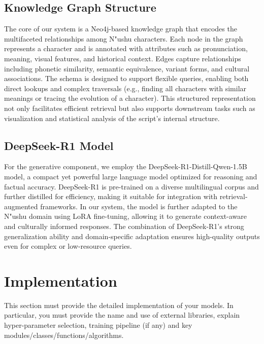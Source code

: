 \documentclass{article}
\begin{document}
\subsection{Knowledge Graph Structure}
\label{ssec:kg_structure}
    The core of our system is a Neo4j-based knowledge graph that encodes the multifaceted relationships among N"{u}shu characters. Each node in the graph represents a character and is annotated with attributes such as pronunciation, meaning, visual features, and historical context. Edges capture relationships including phonetic similarity, semantic equivalence, variant forms, and cultural associations. The schema is designed to support flexible queries, enabling both direct lookups and complex traversals (e.g., finding all characters with similar meanings or tracing the evolution of a character). This structured representation not only facilitates efficient retrieval but also supports downstream tasks such as visualization and statistical analysis of the script's internal structure.

\subsection{DeepSeek-R1 Model}
\label{ssec:deepseek_model}
    For the generative component, we employ the DeepSeek-R1-Distill-Qwen-1.5B model, a compact yet powerful large language model optimized for reasoning and factual accuracy. DeepSeek-R1 is pre-trained on a diverse multilingual corpus and further distilled for efficiency, making it suitable for integration with retrieval-augmented frameworks. In our system, the model is further adapted to the N"{u}shu domain using LoRA fine-tuning, allowing it to generate context-aware and culturally informed responses. The combination of DeepSeek-R1's strong generalization ability and domain-specific adaptation ensures high-quality outputs even for complex or low-resource queries.
    














    
\section{Implementation}
\label{sec:impl}
    This section must provide the detailed implementation of your models. In particular, you must provide the name and use of external libraries, explain hyper-parameter selection, training pipeline (if any) and key modules/classes/functions/algorithms.
    
\end{document}
